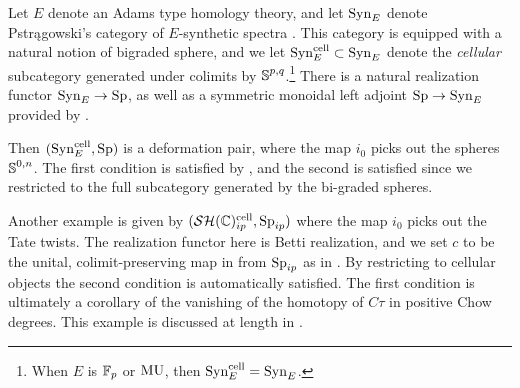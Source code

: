 \begin{exm} \label{exm:syn-part-one}
  Let $E$ denote an Adams type homology theory, and let $\mathrm{Syn}_E$ denote Pstr\k{a}gowski's category of $E$-synthetic spectra \cite{Pstragowski}.
  This category is equipped with a natural notion of bigraded sphere, and we let $\mathrm{Syn}_E ^{\mathrm{cell}} \subset \mathrm{Syn}_E$ denote the \emph{cellular} subcategory generated under colimits by $\operatorname{\mathbb{S}}^{p,q}$.\footnote{ When $E$ is $\operatorname{\mathbb{F}}_p$ or $\operatorname{\mathrm{MU}}$, then $\mathrm{Syn}_E ^{\mathrm{cell}} = \mathrm{Syn}_E$.}
  There is a natural realization functor $\mathrm{Syn}_E \to \operatorname{\mathrm{Sp}}$, as well as a symmetric monoidal left adjoint $\operatorname{\mathrm{Sp}} \to \mathrm{Syn}_E$ provided by \cite[Corollary 4.8.2.19]{HA}.
  
  Then $(\mathrm{Syn}_E ^{\mathrm{cell}}, \operatorname{\mathrm{Sp}})$ is a deformation pair, 
  where the map $i_0$ picks out the spheres $\operatorname{\mathbb{S}}^{0,n}$.
  The first condition is satisfied by \cite[Corollary 4.12]{Pstragowski}, and the second is satisfied since we restricted to the full subcategory generated by the bi-graded spheres.
\end{exm}


\begin{exm}
  Another example is given by $(\mathcal{SH}(\mathbb{C})^{\mathrm{cell}}_{ip}, \operatorname{\mathrm{Sp}}_{ip})$ where the map $i_0$ picks out the Tate twists.
  The realization functor here is Betti realization, and we set $c$ to be the unital, colimit-preserving map in from $\operatorname{\mathrm{Sp}}_{ip}$ as in .
	By restricting to cellular objects the second condition is automatically satisfied. The first condition is ultimately a corollary of the vanishing of the homotopy of $C\tau$ in positive Chow degrees.
  This example is discussed at length in \cite{cmmf}.

\end{exm}

